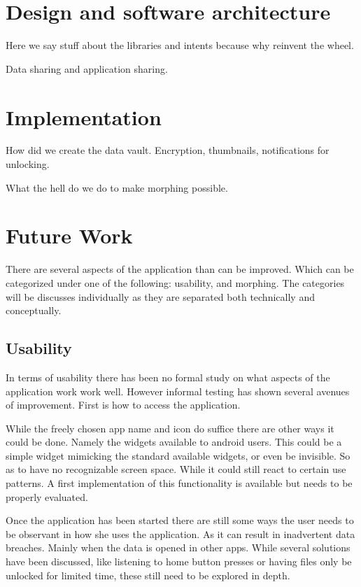 \documentclass[twocolumn,english,compsoc,journal]{IEEEtran}
\begin{document}
\section{Design and software architecture}

Here we say stuff about the libraries and intents because why reinvent
the wheel.

Data sharing and application sharing.


\section{Implementation}

How did we create the data vault. Encryption, thumbnails, notifications
for unlocking.

What the hell do we do to make morphing possible.


\section{Future Work}

There are several aspects of the application than can be improved. Which
can be categorized under one of the following: usability, and morphing.
The categories will be discusses individually as they are separated both
technically and conceptually. 

\subsection{Usability}

In terms of usability there has been no formal study on what aspects of
the application work work well. However informal testing has shown several
avenues of improvement. First is how to access the application. 

While the freely chosen app name and icon do suffice there are other ways 
it could be done. Namely the widgets available to android users. This could 
be a simple widget mimicking the standard available widgets, or even be 
invisible. So as to have no recognizable screen space. While it could still
react to certain use patterns. A first implementation of this functionality is
available but needs to be properly evaluated.

Once the application has been started there are still some ways the user
needs to be observant in how she uses the application. As it can result in
inadvertent data breaches. Mainly when the data is opened in other apps.
While several solutions have been discussed, like listening to home button
presses or having files only be unlocked for limited time, these still need
to be explored in depth.
\end{document}
